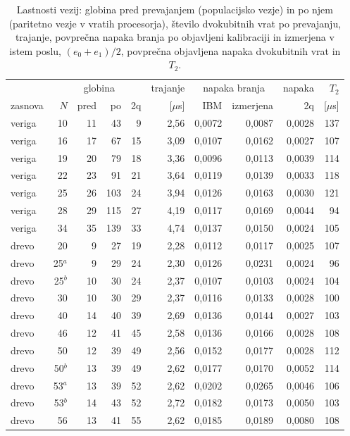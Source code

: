 \begin{table}[htbp]
\caption{Lastnosti vezij: globina pred prevajanjem (populacijsko vezje) in po njem (paritetno vezje v vratih procesorja), število dvokubitnih vrat po prevajanju, trajanje, povprečna napaka branja po objavljeni kalibraciji in izmerjena v istem poslu, $(e_0+e_1)/2$, povprečna objavljena napaka dvokubitnih vrat in $T_2$.}
\label{g20:tab:vezja}
\centering
\footnotesize
\begin{tabular}{lrrrrrrrrr}
\toprule
& & \multicolumn{2}{c}{globina} & & trajanje & \multicolumn{2}{c}{napaka branja} & napaka & $T_2$ \\
zasnova & $N$ & pred & po & 2q & [$\mu$s] & IBM & izmerjena & 2q & [$\mu$s] \\
\midrule
veriga & 10 & 11 & 43 & 9 & 2,56 & 0,0072 & 0,0087 & 0,0028 & 137 \\
veriga & 16 & 17 & 67 & 15 & 3,09 & 0,0107 & 0,0162 & 0,0027 & 107 \\
veriga & 19 & 20 & 79 & 18 & 3,36 & 0,0096 & 0,0113 & 0,0039 & 114 \\
veriga & 22 & 23 & 91 & 21 & 3,64 & 0,0119 & 0,0139 & 0,0033 & 118 \\
veriga & 25 & 26 & 103 & 24 & 3,94 & 0,0126 & 0,0163 & 0,0030 & 121 \\
veriga & 28 & 29 & 115 & 27 & 4,19 & 0,0117 & 0,0169 & 0,0044 & 94 \\
veriga & 34 & 35 & 139 & 33 & 4,74 & 0,0137 & 0,0150 & 0,0024 & 105 \\
\midrule
drevo & 20 & 9 & 27 & 19 & 2,28 & 0,0112 & 0,0117 & 0,0025 & 107 \\
drevo & 25$^{a}$ & 9 & 29 & 24 & 2,30 & 0,0126 & 0,0231 & 0,0024 & 96 \\
drevo & 25$^{b}$ & 10 & 30 & 24 & 2,37 & 0,0107 & 0,0103 & 0,0024 & 104 \\
drevo & 30 & 10 & 30 & 29 & 2,37 & 0,0116 & 0,0133 & 0,0028 & 100 \\
drevo & 40 & 14 & 40 & 39 & 2,69 & 0,0136 & 0,0144 & 0,0027 & 103 \\
drevo & 46 & 12 & 41 & 45 & 2,58 & 0,0136 & 0,0166 & 0,0028 & 108 \\
drevo & 50 & 12 & 39 & 49 & 2,56 & 0,0152 & 0,0177 & 0,0028 & 112 \\
drevo & 50$^{b}$ & 13 & 39 & 49 & 2,62 & 0,0177 & 0,0170 & 0,0052 & 114 \\
drevo & 53$^{a}$ & 13 & 39 & 52 & 2,62 & 0,0202 & 0,0265 & 0,0046 & 106 \\
drevo & 53$^{b}$ & 14 & 43 & 52 & 2,72 & 0,0182 & 0,0173 & 0,0050 & 103 \\
drevo & 56 & 13 & 41 & 55 & 2,62 & 0,0185 & 0,0189 & 0,0080 & 108 \\
\bottomrule
\end{tabular}
\end{table}

